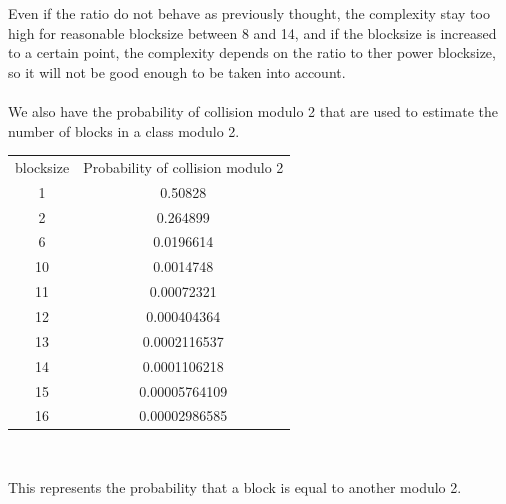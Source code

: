 \documentclass{article}
\begin{document}
Even if the ratio do not behave as previously thought, the complexity stay too high for reasonable blocksize between 8 and 14, and if the blocksize is increased to a certain point, the complexity depends on the ratio to ther power blocksize, so it will not be good enough to be taken into account.\\
\\
We also have the probability of collision modulo 2 that are used to estimate the number of blocks in a class modulo 2.\\
\begin{center}
\begin{tabular}{|c|c|}
  \hline
  blocksize & Probability of collision modulo 2\\
	1 & 0.50828\\
	2 & 0.264899\\
	6 & 0.0196614\\
	10 & 0.0014748\\
	11 & 0.00072321\\ 
	12 & 0.000404364\\
	13 & 0.0002116537\\
	14 & 0.0001106218\\
	15 & 0.00005764109\\
	16 & 0.00002986585\\
	\hline
\end{tabular}\\
\end{center}

This represents the probability that a block is equal to another modulo 2.\\
\end{document}
